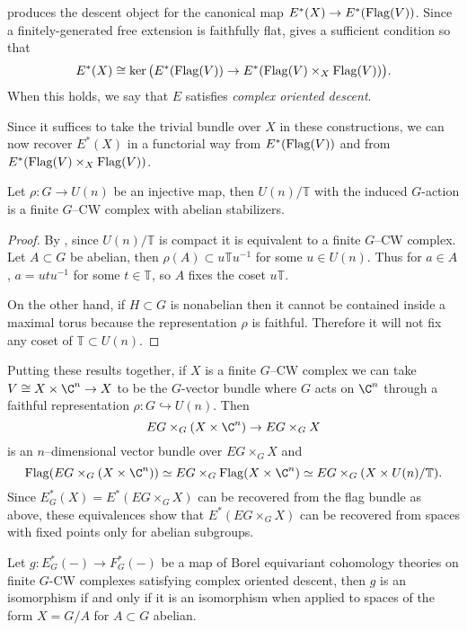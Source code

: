 produces the descent object for the canonical map \(E^*(X) \rightarrow E^*(\operatorname{Flag}(V))\). Since a finitely-generated free extension is faithfully flat,  gives a sufficient condition so that
\begin{equation*}
E^*(X) \cong \ker \big (E^*(\operatorname{Flag}(V)) \rightarrow E^*(\operatorname{Flag}(V) \times_X \operatorname{Flag}(V)) \big ).
\end{equation*}
When this holds, we say that \(E\) satisfies \textit{complex oriented descent}.

Since it suffices to take the trivial bundle over \(X\) in these constructions, we can now recover \(E^*(X)\) in a functorial way from \(E^*(\operatorname{Flag}(V))\) and from \(E^*(\operatorname{Flag}(V) \times_X \operatorname{Flag}(V))\).

\begin{proposition}
Let \(\rho \colon G \rightarrow U(n)\) be an injective map, then \(U(n)/\mathbb{T}\) with the induced \(G\)-action is a finite \(G\)--CW complex with abelian stabilizers.
\end{proposition}
\begin{proof}
By , since \(U(n)/\mathbb{T}\) is compact it is equivalent to a finite \(G\)--CW complex. Let \(A \subset G\) be abelian, then \(\rho(A) \subset u\mathbb{T}u^{-1}\) for some \(u \in U(n)\). Thus for \(a \in A\), \(a = utu^{-1}\) for some \(t \in \mathbb{T}\), so \(A\) fixes the coset \(u\mathbb{T}\).

On the other hand, if \(H \subset G\) is nonabelian then it cannot be contained inside a maximal
torus because the representation \(\rho\) is faithful. Therefore it will not fix any coset of \(\mathbb{T} \subset U(n)\).
\end{proof}

Putting these results together, if \(X\) is a finite \(G\)--CW complex we can take \(V \cong X \times \C^n \rightarrow X\) to be the \(G\)-vector bundle where \(G\) acts on \(\C^n\) through a faithful representation \(\rho \colon G \hookrightarrow U(n)\). Then 
\[
EG \times_G (X \times \C^n) \rightarrow EG \times_G X
\]
is an \(n\)--dimensional vector bundle over \(EG \times_G X\) and
\[
\Flag(EG \times_G (X \times \C^n)) \simeq EG \times_G \Flag(X \times \C^n) \simeq EG \times_G (X \times U(n)/\mathbb{T}).
\]
Since \(E^{*}_{G}(X) = E^*(EG \times_G X)\) can be recovered from the flag bundle as above, these equivalences show that \(E^*(EG \times_G X)\) can be recovered from spaces with fixed points only for abelian subgroups. 

\begin{proposition} \label{app:codescent}
Let \(g \colon E_{G}^*(-) \rightarrow F_{G}^*(-)\) be a map of Borel equivariant cohomology theories on finite \(G\)-CW complexes satisfying complex oriented descent, then \(g\) is an isomorphism if and only if it is an isomorphism when applied to spaces of the form \(X = G/A\) for \(A \subset G\) abelian.
\end{proposition}

